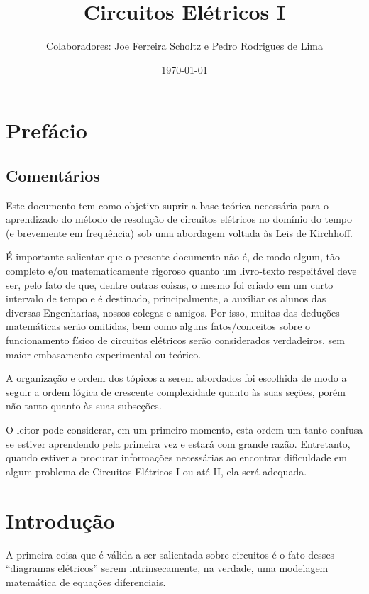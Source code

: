 \documentclass{article}
\title{Circuitos Elétricos I}
\author{Colaboradores: Joe Ferreira Scholtz e Pedro Rodrigues de Lima}
\date{\today}
\numberwithin{equation}{section}
\begin{document}
    \maketitle
    \newpage
    \tableofcontents
    \newpage

    \section{Prefácio}
    \label{sec:pref}

    \subsection{Comentários}
    \label{subsec:coment}

    Este documento tem como objetivo suprir a base teórica necessária para o aprendizado do método de resolução de circuitos elétricos no domínio do tempo (e brevemente em frequência) sob uma abordagem voltada às Leis de Kirchhoff.


    É importante salientar que o presente documento não é, de modo algum, tão completo e/ou matematicamente rigoroso quanto um livro-texto respeitável deve ser, pelo fato de que, dentre outras coisas, o mesmo foi criado em um curto intervalo de tempo e é destinado, principalmente, a auxiliar os alunos das diversas Engenharias, nossos colegas e amigos. Por isso, muitas das deduções matemáticas serão omitidas, bem como alguns fatos/conceitos sobre o funcionamento físico de circuitos elétricos serão considerados verdadeiros, sem maior embasamento experimental ou teórico.

    A organização e ordem dos tópicos a serem abordados foi escolhida de modo a seguir a ordem lógica de crescente complexidade quanto às suas seções, porém não tanto quanto às suas subseções.

    O leitor pode considerar, em um primeiro momento, esta ordem um tanto confusa se estiver aprendendo pela primeira vez e estará com grande razão. Entretanto, quando estiver a procurar informações necessárias ao encontrar dificuldade em algum problema de Circuitos Elétricos I ou até II, ela será adequada.

    \newpage

    \section{Introdução}
    \label{sec:introd}

    A primeira coisa que é válida a ser salientada sobre circuitos é o fato desses ``diagramas elétricos''  serem intrinsecamente, na verdade, uma modelagem matemática de equações diferenciais.
\end{document}
